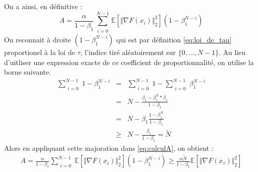\documentclass{article}
\begin{document}
On a ainsi, en définitive : 
\begin{equation}
\label{eq:calculA} 
A= \frac{\alpha}{1-\beta_1} \sum\limits_{\substack{i=0}}^{N-1}  \mathbb{E} \left [ \Vert \nabla F(x_{i}) \Vert ^2_2 \right ] ( 1-\beta_1^{N-i})
\end{equation}
On reconnait à droite $( 1-\beta_1^{N-i})$ qui est par définition \eqref{eq:loi_de_tau} proportionel à la loi de $\tau$, l'indice tiré aléatoirement sur $\{0,...,N-1 \}$. Au lieu d'uitliser une expression exacte de ce coefficient de proportionnalité, on utilise la borne suivante. 
\begin{eqnarray*}
    \sum\limits_{\substack{i=0}}^{N-1} 1 - \beta_1^{N-i} &=& \sum\limits_{\substack{i=0}}^{N-1} 1 - \sum\limits_{\substack{i=0}}^{N-1} \beta_1^{N-i} \\
    &=& N- \frac{\beta_1-\beta_1^N*\beta_1}{1-\beta_1} \\
    &=& N- \beta_1 \frac{1-\beta_1^N}{1-\beta_1} \\
    &\geq& N - \frac{\beta_1}{1-\beta_1} = \tilde{N}
\end{eqnarray*}
%
Alors en appliquant cette majoration dans \eqref{eq:calculA}, on obtient :
\begin{eqnarray}
    A= \frac{\alpha}{1-\beta_1} \sum\limits_{\substack{i=0}}^{N-1}  \mathbb{E} \left [ \Vert \nabla F(x_{i}) \Vert ^2_2 \right ] ( 1-\beta_1^{N-i}) \geq \frac{\alpha \tilde{N}}{1-\beta_1}   \mathbb{E} \left [ \Vert \nabla F(x_{\tau}) \Vert ^2_2 \right ]  \nonumber
\end{eqnarray}   

\bigskip
\end{document}

